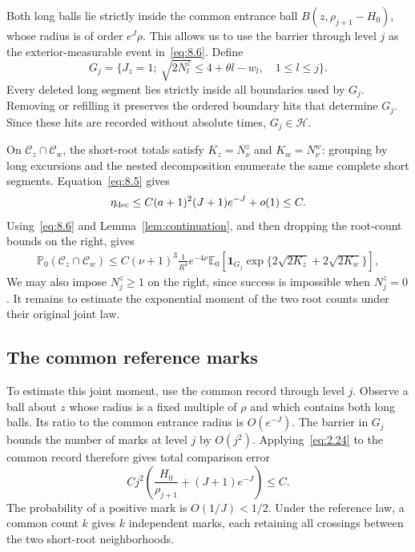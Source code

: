 \documentclass[11pt,a4paper]{article}
\numberwithin{equation}{section}
\theoremstyle{remark}
\begin{document}
Both long balls lie strictly inside the common entrance ball $B(z,\rho_{j+1}-H_0)$, whose radius is of order $e^J\rho$. This allows us to use the barrier through level $j$ as the exterior-measurable event in~\eqref{eq:8.6}. Define
\begin{equation}\label{eq:8.9}
G_j=\{J_z=1;\ \sqrt{2N_l^z}\le4+\theta l-w_l,\quad1\le l\le j\}.
\end{equation}
Every deleted long segment lies strictly inside all boundaries used by $G_j$. Removing or refilling it preserves the ordered boundary hits that determine $G_j$. Since these hits are recorded without absolute times, $G_j\in\mathscr H$.

On $\mathcal C_z\cap\mathcal C_w$, the short-root totals satisfy
$K_z=N_\nu^z$ and $K_w=N_\nu^w$: grouping by long excursions and the nested decomposition enumerate the same complete short segments. Equation~\eqref{eq:8.5} gives
\begin{equation}\label{eq:8.10}
\eta_{\rm dec}\le C(a+1)^2(J+1)e^{-J}+o(1)\le C.
\end{equation}
Using~\eqref{eq:8.6} and Lemma~\ref{lem:continuation}, and then dropping the root-count bounds on the right, gives
\begin{equation}\label{eq:8.11}
\begin{split}
\mathbb P_0(\mathcal C_z\cap\mathcal C_w)
\le C(\nu+1)^3\frac{1}{R^4}e^{-4\nu}
\mathbb E_0[\mathbf1_{G_j}\exp\{2\sqrt{2K_z}+2\sqrt{2K_w}\}],
\end{split}
\end{equation}
We may also impose $N_j^z\ge1$ on the right, since success is impossible when $N_j^z=0$. It remains to estimate the exponential moment of the two root counts under their original joint law.

\subsection{The common reference marks}\label{sec:commonmarks}
To estimate this joint moment, use the common record through level $j$. Observe a ball about $z$ whose radius is a fixed multiple of $\rho$ and which contains both long balls. Its ratio to the common entrance radius is $O(e^{-J})$. The barrier in $G_j$ bounds the number of marks at level $j$ by $O(j^2)$. Applying~\eqref{eq:2.24} to the common record therefore gives total comparison error
\begin{equation}\label{eq:8.12}
Cj^2\left(\frac{H_0}{\rho_{j+1}}+(J+1)e^{-J}\right)\le C.
\end{equation}
The probability of a positive mark is $O(1/J)<1/2$. Under the reference law, a common count $k$ gives $k$ independent marks, each retaining all crossings between the two short-root neighborhoods.
\end{document}

